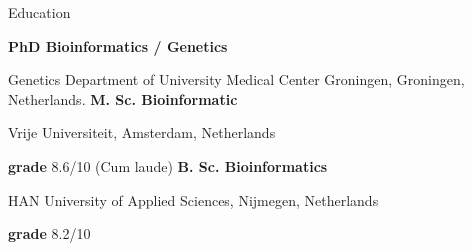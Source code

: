 \begin{rubric}{Education}

%
	\textbf{PhD Bioinformatics / Genetics} \par
	Genetics Department of University Medical Center Groningen, Groningen, Netherlands.
%
%
	\textbf{M. Sc. Bioinformatic} \par
	Vrije Universiteit, Amsterdam, Netherlands \par
	\textbf{grade} 8.6/10 (Cum laude)
%
%
	\textbf{B. Sc. Bioinformatics} \par
	HAN University of Applied Sciences, Nijmegen, Netherlands \par
	\textbf{grade} 8.2/10
%
\end{rubric}

